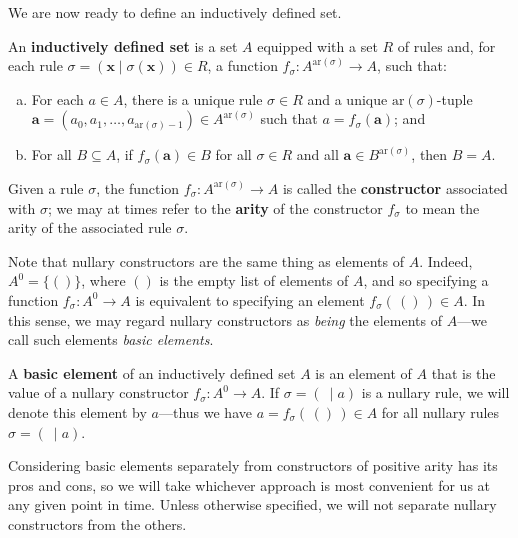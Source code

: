 We are now ready to define an inductively defined set.

\begin{definition}
\label{defInductivelyDefinedSet}
An \textbf{inductively defined set} is a set $A$ equipped with a set $R$ of rules and, for each rule $\sigma = (\mathbf{x} \mid \sigma(\mathbf{x})) \in R$, a function $f_{\sigma} : A^{\mathrm{ar}(\sigma)} \to A$, such that:
\begin{enumerate}[(a)]
\item For each $a \in A$, there is a unique rule $\sigma \in R$ and a unique $\mathrm{ar}(\sigma)$-tuple $\mathbf{a} = (a_0,a_1,\dots,a_{\mathrm{ar}(\sigma)-1}) \in A^{\mathrm{ar}(\sigma)}$ such that $a = f_{\sigma}(\mathbf{a})$; and
\item For all $B \subseteq A$, if $f_{\sigma}(\mathbf{a}) \in B$ for all $\sigma \in R$ and all $\mathbf{a} \in B^{\mathrm{ar}(\sigma)}$, then $B = A$.
\end{enumerate}
Given a rule $\sigma$, the function $f_{\sigma} : A^{\mathrm{ar}(\sigma)} \to A$ is called the \textbf{constructor} associated with $\sigma$; we may at times refer to the \textbf{arity} of the constructor $f_{\sigma}$ to mean the arity of the associated rule $\sigma$.
\end{definition}

Note that nullary constructors are the same thing as elements of $A$. Indeed, $A^0 = \{ () \}$, where $()$ is the empty list of elements of $A$, and so specifying a function $f_{\sigma} : A^0 \to A$ is equivalent to specifying an element $f_{\sigma}(\,()\,) \in A$. In this sense, we may regard nullary constructors as \textit{being} the elements of $A$---we call such elements \textit{basic elements}.

\begin{definition}
\label{defBasicElement}
A \textbf{basic element} of an inductively defined set $A$ is an element of $A$ that is the value of a nullary constructor $f_{\sigma} : A^0 \to A$. If $\sigma = (~ \mid a)$ is a nullary rule, we will denote this element by $a$---thus we have $a = f_{\sigma}(\,()\,) \in A$ for all nullary rules $\sigma = (~ \mid a)$.
\end{definition}

Considering basic elements separately from constructors of positive arity has its pros and cons, so we will take whichever approach is most convenient for us at any given point in time. Unless otherwise specified, we will not separate nullary constructors from the others.

